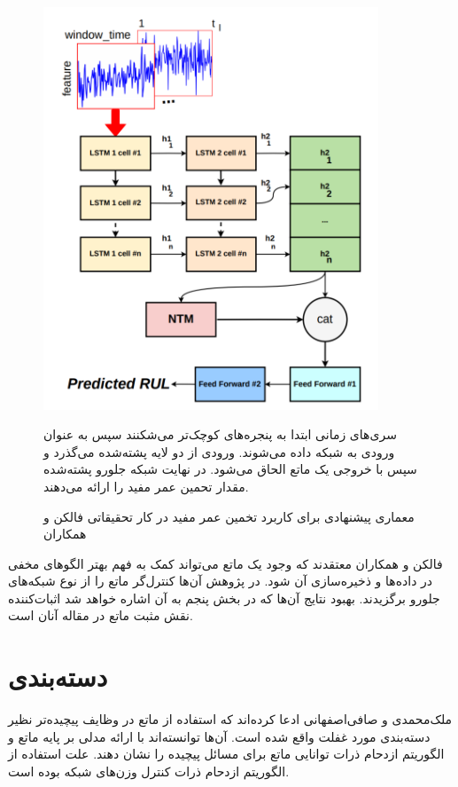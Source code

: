 \begin{figure}[!h]
\begin{center}
\includegraphics[height=12cm]{RUL.png}
\end{center}
\caption{معماری پیشنهادی برای کاربرد تخمین عمر مفید در کار تحقیقاتی فالکن و همکاران\cite{falcon2020neural}}
\medskip
\small
سری‌های زمانی ابتدا به پنجره‌های کوچک‌تر می‌شکنند سپس به عنوان ورودی به شبکه داده می‌شوند. ورودی از دو لایه  پشته‌شده می‌گذرد و سپس با خروجی یک ماتع الحاق می‌شود. در نهایت شبکه جلورو پشته‌شده مقدار تحمین عمر مفید را ارائه می‌دهند. 
\end{figure}

فالکن و همکاران معتقدند که وجود یک ماتع می‌تواند کمک به فهم بهتر الگوهای مخفی در داده‌ها و ذخیره‌سازی آن شود. در پژوهش آن‌ها کنترل‌گر ماتع را از نوع شبکه‌های جلورو برگزیدند.\cite{falcon2020neural} بهبود نتایج آن‌ها که در بخش پنجم به آن اشاره خواهد شد اثبات‌کننده نقش مثبت ماتع در مقاله آنان است.

\section{دسته‌بندی}
ملک‌محمدی و صافی‌اصفهانی ادعا کرده‌اند که استفاده از ماتع در وظایف پیچیده‌تر نظیر دسته‌بندی مورد غفلت واقع شده است. آن‌ها توانسته‌اند با ارائه مدلی بر پایه ماتع و الگوریتم ازدحام ذرات توانایی ماتع برای مسائل پیچیده را نشان دهند. علت استفاده از الگوریتم ازدحام ذرات کنترل وزن‌های شبکه بوده است.\cite{faradonbe2020classifier}
\\

